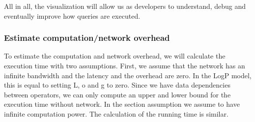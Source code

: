 \documentclass[11pt]{article}
\begin{document}
	All in all, the visualization will allow us as developers to understand, debug and eventually improve how queries are executed.

	\subsubsection{Estimate computation/network overhead}
	\label{sec:overhead}

	To estimate the computation and network overhead, we will calculate the execution time with two assumptions. First, we assume that the network has an infinite bandwidth and the latency and the overhead are zero. In the LogP model, this is equal to setting L, o and g to zero. Since we have data dependencies between operators, we can only compute an upper and lower bound for the execution time without network. In the section assumption we assume to have infinite computation power. The calculation of the running time is similar.

\end{document}

